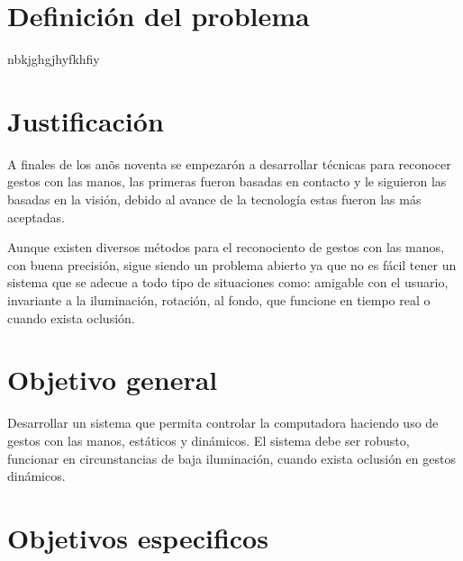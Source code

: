 \section{Definici\'on del problema}\label{sec: Definici\'on del problema}

nbkjghgjhyfkhfiy

\section{Justificaci\'on}\label{sec: Justificaci\'on}

A finales de los an\~os noventa se empezar\'on a desarrollar t\'ecnicas para reconocer gestos con las manos, las primeras fueron basadas en contacto y le siguieron las basadas en la visi\'on, debido al avance de la tecnolog\'ia estas fueron las m\'as aceptadas. 

Aunque existen diversos m\'etodos para el reconociento de gestos con las manos, con buena precisi\'on, sigue siendo un problema abierto ya que no es f\'acil tener un sistema que se adecue a todo tipo de situaciones como: amigable con el usuario, invariante a la iluminaci\'on, rotaci\'on, al fondo, que funcione en tiempo real o cuando exista oclusi\'on.

\section{Objetivo general}\label{Objetivo general}
 
Desarrollar un sistema que permita controlar la computadora haciendo uso de gestos con las manos, estáticos y dinámicos. El sistema debe ser robusto, funcionar en circunstancias de baja iluminación, cuando exista oclusión en gestos dinámicos.

\section{Objetivos especificos}\label{bjetivos especificos}

